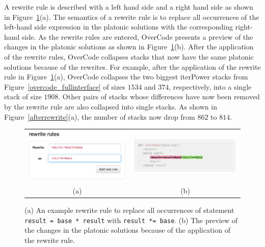 \documentclass[12pt,twoside]{mitthesis}
\newcommand \codevar[1]{\texttt{#1}}
\begin{document}
A rewrite rule is described with a left hand side and a right hand side as shown in Figure~\ref{rewriterule}(a). The semantics of a rewrite rule is to replace all occurrences of the left-hand side expression in the platonic solutions with the corresponding right-hand side. As the rewrite rules are entered, OverCode presents a preview of the changes in the platonic solutions as shown in Figure~\ref{rewriterule}(b). After the application of the rewrite rules, OverCode collapses stacks that now have the same platonic solutions because of the rewrites. For example, after the application of the rewrite rule in Figure~\ref{rewriterule}(a), OverCode collapses the two biggest iterPower stacks from Figure~\ref{overcode_fullinterface} of sizes $1534$ and $374$, respectively, into a single stack of size $1908$. Other pairs of stacks whose differences have now been removed by the rewrite rule are also collapsed into single stacks. As shown in Figure~\ref{afterrewrite}(a), the number of stacks now drop from $862$ to $814$.

\begin{figure}[htpb]
\begin{tabular}{c | c}
\begin{minipage}{.5\linewidth}
\centering
\includegraphics[scale=0.45]{Body/figures/overcode/rewriteRuleScreenshot.png}
\end{minipage}
&
\begin{minipage}{.5\linewidth}
\centering
\includegraphics[scale=0.40]{Body/figures/overcode/rewritePreviewScreenShot.png}
\end{minipage}
\\
(a) & (b)
\end{tabular}
\caption{(a) An example rewrite rule to replace all occurrences of statement \codevar{result = base * result} with \codevar{result *= base}. (b) The preview of the changes in the platonic solutions because of the application of the rewrite rule.}
\label{rewriterule}
\end{figure}
\end{document}
